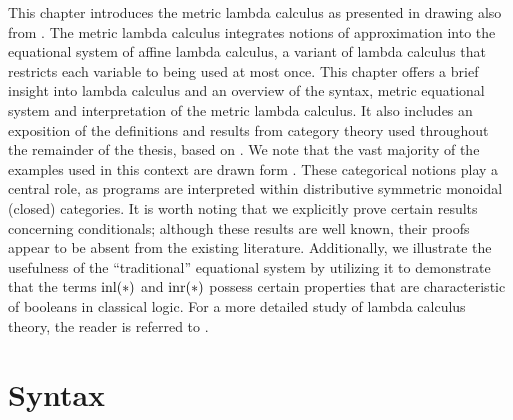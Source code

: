 This chapter introduces the metric lambda calculus as presented in \cite{dahlqvist2023syntactic} drawing also from \cite{mackieLanguageAutonomous1993,croleCategoriesTypes1994,selinger2013lecture}. The metric lambda calculus integrates notions of
approximation into the equational system of affine lambda calculus, a variant of lambda calculus that restricts each variable to being used at most once.  This chapter offers a brief insight into lambda calculus and an overview of the syntax, metric equational system and interpretation of the metric lambda calculus. It also includes an exposition of the definitions and results from category theory used throughout the remainder of the thesis,  based on \cite{yanofskyMonoidalCategoryTheory2024,barrCategoryTheoryComputing1990,maclane13}. We note that the vast majority of the examples used in this context are drawn form \cite{yanofskyMonoidalCategoryTheory2024}.  These categorical notions play a central role, as programs are interpreted within distributive symmetric monoidal (closed) categories.
 It is worth noting that we explicitly prove certain results concerning conditionals; although these results are well known, their proofs appear to be absent from the existing literature. Additionally, we illustrate the usefulness of the ``traditional'' equational system by utilizing it to demonstrate that the terms $\mathrm{inl}(*)$ and $\mathrm{inr}(*)$ possess certain properties that are characteristic of booleans in classical logic.
For a more detailed study of lambda calculus theory, the reader is referred to \cite{barendregt1984lambda}.

 








\section{Syntax}


